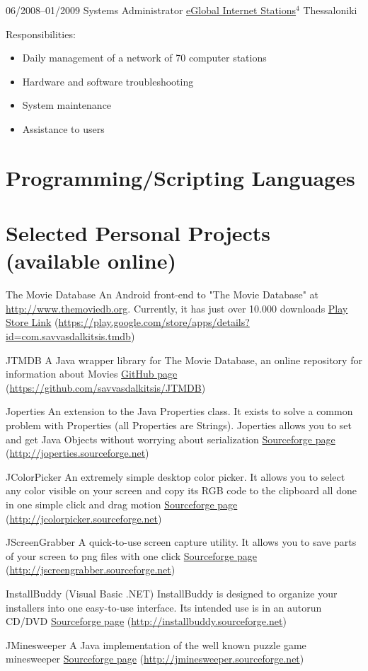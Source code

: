 \documentclass[11pt,a4paper,sans]{moderncv}   %
\newcommand{\superscript}[1]{$^{#1}$}
\newcommand{\urlfootnote}[2]{\footnotetext[#1]{\href{#2}{#2}}}
\newcommand{\personalproject}[4]{
\cventry
  {#1}
  {#2}
  {}{}{}
  {\href{#4}{#3} (\href{#4}{#4})}
}
\begin{document}
\cventry
  {06/2008--01/2009}
  {Systems Administrator}
  {\href{www.eglobal.gr}{eGlobal Internet Stations}\superscript{4}}
  {Thessaloniki}
  {}
  {
    Responsibilities:%
    \begin{itemize}%
    \item Daily management of a network of 70 computer stations
    \item Hardware and software troubleshooting
    \item System maintenance
    \item Assistance to users
    \end{itemize}
  }
\urlfootnote{4}{http://www.eglobal.gr}

\section{Programming/Scripting Languages}


\section{Selected Personal Projects (available online)}
\personalproject
  {The Movie Database}
  {
    An Android front-end to "The Movie Database" at \href{http://www.themoviedb.org}{http://www.themoviedb.org}. 
    Currently, it has just over 10.000 downloads
  }
  {Play Store Link}{https://play.google.com/store/apps/details?id=com.savvasdalkitsis.tmdb}
\personalproject
  {JTMDB}
  {A Java wrapper library for The Movie Database, an online repository for information about Movies}
  {GitHub page}{https://github.com/savvasdalkitsis/JTMDB}
\personalproject
  {Joperties}
  {
    An extension to the Java Properties class. It exists to solve a common problem with Properties (all Properties are Strings).
    Joperties allows you to set and get Java Objects without worrying about serialization
  }
  {Sourceforge page}{http://joperties.sourceforge.net}
\personalproject
  {JColorPicker}
  {
    An extremely simple desktop color picker. It allows you to select any color visible on your screen and copy its RGB code to the
    clipboard all done in one simple click and drag motion
  }
  {Sourceforge page}{http://jcolorpicker.sourceforge.net}
\personalproject
  {JScreenGrabber}
  {A quick-to-use screen capture utility. It allows you to save parts of your screen to png files with one click} 
  {Sourceforge page}{http://jscreengrabber.sourceforge.net}
\personalproject
  {InstallBuddy (Visual Basic .NET)}
  {
    InstallBuddy is designed to organize your installers into one easy-to-use interface. Its intended use is
    in an autorun CD/DVD
  }
  {Sourceforge page}{http://installbuddy.sourceforge.net}
\personalproject
  {JMinesweeper}
  {A Java implementation of the well known puzzle game minesweeper}
  {Sourceforge page}{http://jminesweeper.sourceforge.net}
  
\end{document}
